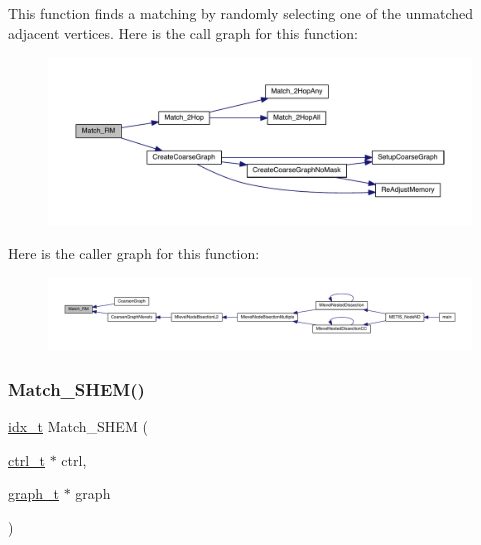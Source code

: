 This function finds a matching by randomly selecting one of the unmatched adjacent vertices. Here is the call graph for this function\+:\nopagebreak
\begin{figure}[H]
\begin{center}
\leavevmode
\includegraphics[width=350pt]{a00945_a892d2ea16d613abc2276ad5fc6999724_cgraph}
\end{center}
\end{figure}
Here is the caller graph for this function\+:\nopagebreak
\begin{figure}[H]
\begin{center}
\leavevmode
\includegraphics[width=350pt]{a00945_a892d2ea16d613abc2276ad5fc6999724_icgraph}
\end{center}
\end{figure}
\mbox{\label{a00945_af3ec72f3170ccdca06d8ad018d86cc58}} 
\subsubsection{\texorpdfstring{Match\+\_\+\+S\+H\+E\+M()}{Match\_SHEM()}}
{\footnotesize\ttfamily \hyperlink{a00876_aaa5262be3e700770163401acb0150f52}{idx\+\_\+t} Match\+\_\+\+S\+H\+EM (\begin{DoxyParamCaption}\item[{\hyperlink{a00742}{ctrl\+\_\+t} $\ast$}]{ctrl,  }\item[{\hyperlink{a00734}{graph\+\_\+t} $\ast$}]{graph }\end{DoxyParamCaption})}

